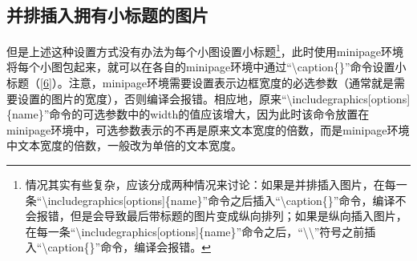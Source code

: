 \documentclass{article}
\begin{document}
\subsection{并排插入拥有小标题的图片}
    但是上述这种设置方式没有办法为每个小图设置小标题\footnote{情况其实有些复杂，应该分成两种情况来讨论：如果是并排插入图片，在每一条``\textbackslash includegraphics[options]\{name\}''命令之后插入``\textbackslash caption\{\}''命令，编译不会报错，但是会导致最后带标题的图片变成纵向排列；如果是纵向插入图片，在每一条``\textbackslash includegraphics[options]\{name\}''命令之后，``\textbackslash\textbackslash''符号之前插入``\textbackslash caption\{\}''命令，编译会报错。}，此时使用minipage环境将每个小图包起来，就可以在各自的minipage环境中通过``\textbackslash caption\{\}''命令设置小标题（\ref{6}）。注意，minipage环境需要设置表示边框宽度的必选参数（通常就是需要设置的图片的宽度），否则编译会报错。相应地，原来``\textbackslash includegraphics[options]\{name\}''命令的可选参数中的width的值应该增大，因为此时该命令放置在minipage环境中，可选参数表示的不再是原来文本宽度的倍数，而是minipage环境中文本宽度的倍数，一般改为单倍的文本宽度。
\end{document}

